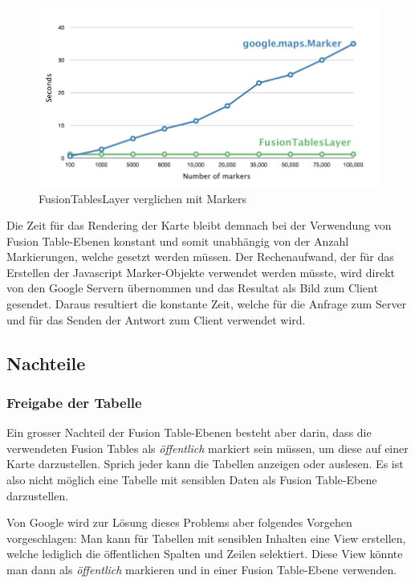 \begin{figure}[htbp]
	\centering
	\includegraphics[scale=0.5]{images/gmap_fusiontableslayer_vs_markers.png}
	\caption{FusionTablesLayer verglichen mit Markers}
	\label{fusiontableslayer-compare_markers}
\end{figure}

Die Zeit für das Rendering der Karte bleibt demnach bei der Verwendung von Fusion Table-Ebenen konstant und somit unabhängig von der Anzahl Markierungen, welche gesetzt werden müssen. Der Rechenaufwand, der für das Erstellen der Javascript Marker-Objekte verwendet werden müsste, wird direkt von den Google Servern übernommen und das Resultat als Bild zum Client gesendet. Daraus resultiert die konstante Zeit, welche für die Anfrage zum Server und für das Senden der Antwort zum Client verwendet wird.

\subsection{Nachteile}
\subsubsection{Freigabe der Tabelle}
Ein grosser Nachteil der Fusion Table-Ebenen besteht aber darin, dass die verwendeten Fusion Tables als  \emph{öffentlich} markiert sein müssen, um diese auf einer Karte darzustellen. Sprich jeder kann die Tabellen anzeigen oder auslesen. Es ist also nicht möglich eine Tabelle mit sensiblen Daten als Fusion Table-Ebene darzustellen.

Von Google wird zur Lösung dieses Problems aber folgendes Vorgehen vorgeschlagen: Man kann für Tabellen mit sensiblen Inhalten eine View erstellen, welche lediglich die öffentlichen Spalten und Zeilen selektiert. Diese View könnte man dann als \emph{öffentlich} markieren und in einer Fusion Table-Ebene verwenden.

